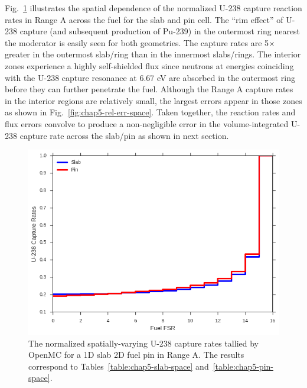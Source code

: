 Fig.~\ref{fig:chap5-u238-capture-space} illustrates the spatial dependence of the normalized U-238 capture reaction rates in Range A across the fuel for the slab and pin cell. The ``rim effect'' of U-238 capture (and subsequent production of Pu-239) in the outermost ring nearest the moderator is easily seen for both geometries. The capture rates are 5$\times$ greater in the outermost slab/ring than in the innermost slabs/rings. The interior zones experience a highly self-shielded flux since neutrons at energies coinciding with the U-238 capture resonance at 6.67 eV are absorbed in the outermost ring before they can further penetrate the fuel. Although the Range A capture rates in the interior regions are relatively small, the largest errors appear in those zones as shown in Fig.~\ref{fig:chap5-rel-err-space}. Taken together, the reaction rates and flux errors convolve to produce a non-negligible error in the volume-integrated U-238 capture rate across the slab/pin as shown in next section.

\begin{figure}[h!]
  \centering
  \includegraphics[width=0.8\linewidth]{figures/biases/u238-capt-rates-fuel-fsrs}
  \caption{}
\caption[U-238 capture rates by FSR]{The normalized spatially-varying U-238 capture rates tallied by OpenMC for a 1D slab 2D fuel pin in Range A. The results correspond to Tables~\ref{table:chap5-slab-space} and~\ref{table:chap5-pin-space}.}
\label{fig:chap5-u238-capture-space}
\end{figure}


